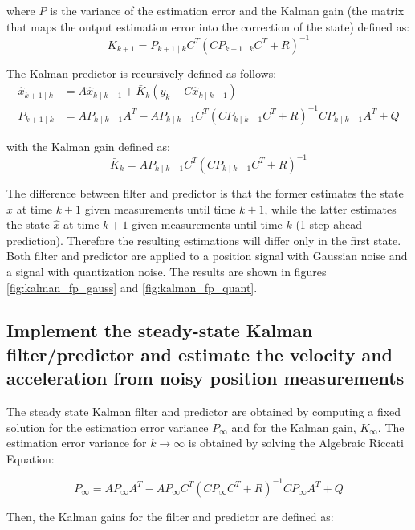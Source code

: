 where $P$ is the variance of the estimation error and the Kalman gain (the matrix that maps the output estimation error into the correction of the state) defined as:
\begin{equation*}
K_{k+1}=P_{k+1\mid k}C^T(CP_{k+1\mid k}C^T+R)^{-1}
\end{equation*}

The Kalman predictor is recursively defined as follows:
\begin{align*}
\hat x_{k+1\mid k}&=A\hat x_{k\mid k-1}+\bar K_{k}(y_{k}-C\hat x_{k\mid k-1})\\
P_{k+1\mid k}&=AP_{k\mid k-1}A^T-AP_{k\mid k-1}C^T(CP_{k\mid k-1}C^T+R)^{-1}CP_{k\mid k-1}A^T+Q
\end{align*}

with the Kalman gain defined as:
\begin{equation*}
\bar K_{k}=AP_{k\mid k-1}C^T(CP_{k\mid k-1}C^T+R)^{-1}
\end{equation*}

The difference between filter and predictor is that the former estimates the state $\hat x$ at time $k+1$ given measurements until time $k+1$, while the latter estimates the state $\hat x$ at time $k+1$ given measurements until time $k$ (1-step ahead prediction). Therefore the resulting estimations will differ only in the first state. Both filter and predictor are applied to a position signal with Gaussian noise and a signal with quantization noise. The results are shown in figures \ref{fig:kalman_fp_gauss} and \ref{fig:kalman_fp_quant}.

\subsection{Implement the steady-state Kalman filter/predictor and estimate the velocity and acceleration from noisy position measurements}

The steady state Kalman filter and predictor are obtained by computing a fixed solution for the estimation error variance $P_{\infty}$ and for the Kalman gain, $K_{\infty}$. The estimation error variance for $k\to\infty$ is obtained by solving the Algebraic Riccati Equation:

\begin{equation*}
P_\infty = AP_\infty A^T-AP_\infty C^T(CP_\infty C^T + R)^{-1}CP_\infty A^T + Q
\end{equation*}

Then, the Kalman gains for the filter and predictor are defined as:

